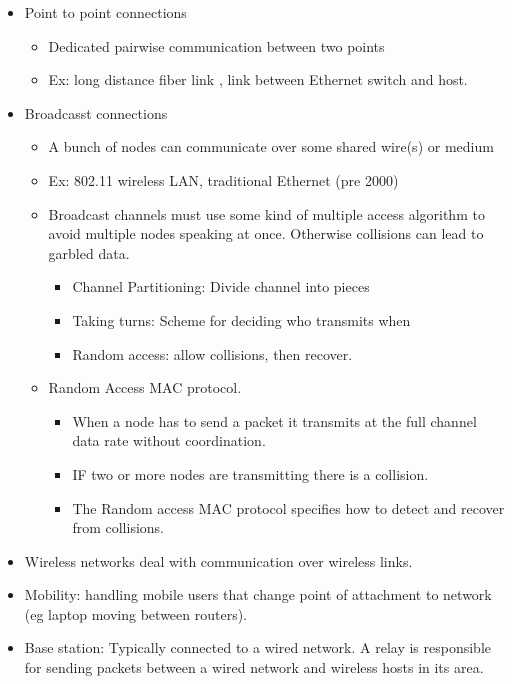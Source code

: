 \documentclass[]{article}
\providecommand{\tightlist}{%
  \setlength{\itemsep}{0pt}\setlength{\parskip}{0pt}}
\begin{document}
\begin{itemize}
\tightlist
\item
  Point to point connections

  \begin{itemize}
  \tightlist
  \item
    Dedicated pairwise communication between two points
  \item
    Ex: long distance fiber link , link between Ethernet switch and
    host.
  \end{itemize}
\item
  Broadcasst connections

  \begin{itemize}
  \tightlist
  \item
    A bunch of nodes can communicate over some shared wire(s) or medium
  \item
    Ex: 802.11 wireless LAN, traditional Ethernet (pre 2000)
  \item
    Broadcast channels must use some kind of multiple access algorithm
    to avoid multiple nodes speaking at once. Otherwise collisions can
    lead to garbled data.

    \begin{itemize}
    \tightlist
    \item
      Channel Partitioning: Divide channel into pieces
    \item
      Taking turns: Scheme for deciding who transmits when
    \item
      Random access: allow collisions, then recover.
    \end{itemize}
  \item
    Random Access MAC protocol.

    \begin{itemize}
    \tightlist
    \item
      When a node has to send a packet it transmits at the full channel
      data rate without coordination.
    \item
      IF two or more nodes are transmitting there is a collision.
    \item
      The Random access MAC protocol specifies how to detect and recover
      from collisions.
    \end{itemize}
  \end{itemize}
\item
  Wireless networks deal with communication over wireless links.
\item
  Mobility: handling mobile users that change point of attachment to
  network (eg laptop moving between routers).
\item
  Base station: Typically connected to a wired network. A relay is
  responsible for sending packets between a wired network and wireless
  hosts in its area.


\end{itemize}
\end{document}
